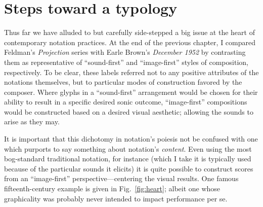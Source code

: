 \section{Steps toward a typology}


    Thus far we have alluded to but carefully side-stepped a big issue at the heart of contemporary notation practices. At the end of the previous chapter, I compared Feldman's \textit{Projection} series with Earle Brown's \textit{December 1952} by contrasting them as representative of ``sound-first'' and ``image-first'' styles of composition, respectively. To be clear, these labels referred not to any positive attributes of the notations themselves, but to particular modes of construction favored by the composer. Where glyphs in a ``sound-first'' arrangement would be chosen for their ability to result in a specific desired sonic outcome, ``image-first'' compositions would be constructed based on a desired visual aesthetic; allowing the sounds to arise as they may.
    
    
    It is important that this dichotomy in notation's poiesis not be confused with one which purports to say something about notation's \textit{content}. Even using the most bog-standard traditional notation, for instance (which I take it is typically used because of the particular sounds it elicits) it is quite possible to construct scores from an ``image-first'' perspective---centering the visual results. One famous fifteenth-century example is given in Fig.~\ref{fig:heart}; albeit one whose graphicality was probably never intended to impact performance per se.
    
